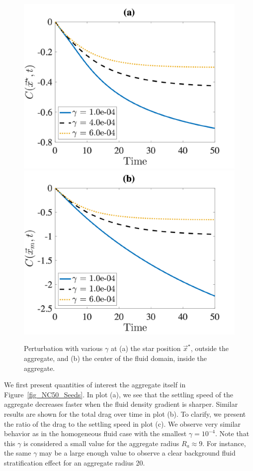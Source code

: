 \begin{figure}[h]
	\begin{center}
		\includegraphics[scale=0.33]{./figures/fig_NC50_g_C_star.pdf}
		\includegraphics[scale=0.33]{./figures/fig_NC50_g_C_M}
	\caption{Perturbation with various $\gamma$ at (a) the star position $\vec{x}^{\star}$, outside the aggregate, and (b) the center of the fluid domain, inside the aggregate.}
	\label{fig_NC50_gCM}
\end{center}
\end{figure}
\par
We first present quantities of interest 
the aggregate itself in Figure~\ref{fig_NC50_Seeds}. In plot (a), we see that the settling speed of the aggregate decreases faster when the fluid density gradient is sharper. Similar results are shown for the total drag over time in plot (b). To clarify, we present the ratio of the drag to the settling speed in plot (c). We observe very similar behavior as in the homogeneous fluid case with the smallest $\gamma = 10^{-4}$. Note that this $\gamma$ is considered a small value for the aggregate radius $R_a \approx 9$. For instance, the same $\gamma$ may be a large enough value to observe a clear background fluid stratification effect for an aggregate radius 20.
